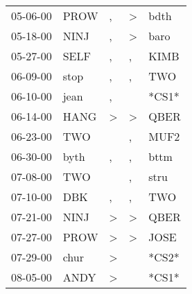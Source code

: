 \begin{supertabular}{p{0.07\textwidth}p{0.06\textwidth}p{0.02\textwidth}p{0.02\textwidth}p{0.06\textwidth}}
          05-06-00\textsuperscript{} &           PROW\textsuperscript{} &                , &     \textgreater &           bdth\textsuperscript{} \\
          05-18-00\textsuperscript{} &           NINJ\textsuperscript{} &                , &     \textgreater &           baro\textsuperscript{} \\
          05-27-00\textsuperscript{} &           SELF\textsuperscript{} &                , &                , &           KIMB\textsuperscript{} \\
          06-09-00\textsuperscript{} &           stop\textsuperscript{} &                , &                , &            TWO\textsuperscript{} \\
          06-10-00\textsuperscript{} &           jean\textsuperscript{} &                , &                  &                            *CS1* \\
          06-14-00\textsuperscript{} &           HANG\textsuperscript{} &     \textgreater &     \textgreater &           QBER\textsuperscript{} \\
          06-23-00\textsuperscript{} &            TWO\textsuperscript{} &                  &                , &           MUF2\textsuperscript{} \\
          06-30-00\textsuperscript{} &           byth\textsuperscript{} &                , &                , &           bttm\textsuperscript{} \\
          07-08-00\textsuperscript{} &            TWO\textsuperscript{} &                  &                , &           stru\textsuperscript{} \\
          07-10-00\textsuperscript{} &            DBK\textsuperscript{} &                , &                , &            TWO\textsuperscript{} \\
          07-21-00\textsuperscript{} &           NINJ\textsuperscript{} &     \textgreater &     \textgreater &           QBER\textsuperscript{} \\
          07-27-00\textsuperscript{} &           PROW\textsuperscript{} &     \textgreater &     \textgreater &           JOSE\textsuperscript{} \\
          07-29-00\textsuperscript{} &           chur\textsuperscript{} &     \textgreater &                  &                            *CS2* \\
          08-05-00\textsuperscript{} &           ANDY\textsuperscript{} &     \textgreater &                  &                            *CS1* \\

\end{supertabular}
